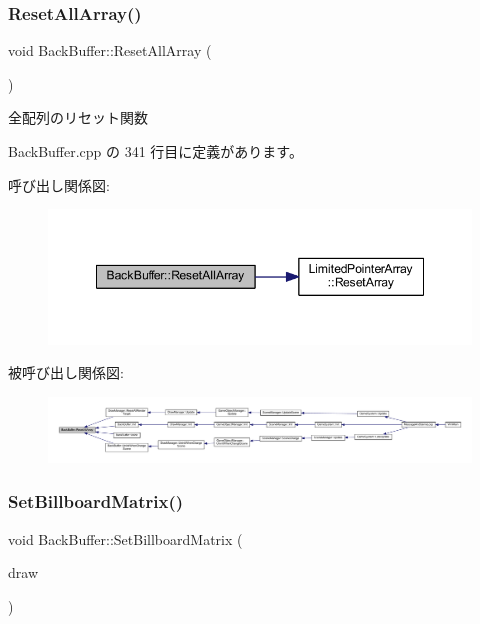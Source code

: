 \subsubsection{\texorpdfstring{Reset\+All\+Array()}{ResetAllArray()}}
{\footnotesize\ttfamily void Back\+Buffer\+::\+Reset\+All\+Array (\begin{DoxyParamCaption}{ }\end{DoxyParamCaption})}



全配列のリセット関数 



 Back\+Buffer.\+cpp の 341 行目に定義があります。

呼び出し関係図\+:
\nopagebreak
\begin{figure}[H]
\begin{center}
\leavevmode
\includegraphics[width=348pt]{class_back_buffer_a04e942576ac5de94d16764d347111234_cgraph}
\end{center}
\end{figure}
被呼び出し関係図\+:
\nopagebreak
\begin{figure}[H]
\begin{center}
\leavevmode
\includegraphics[width=350pt]{class_back_buffer_a04e942576ac5de94d16764d347111234_icgraph}
\end{center}
\end{figure}
\mbox{\label{class_back_buffer_a5c9341c9d26576781ec9abb55b937bda}} 
\subsubsection{\texorpdfstring{Set\+Billboard\+Matrix()}{SetBillboardMatrix()}}
{\footnotesize\ttfamily void Back\+Buffer\+::\+Set\+Billboard\+Matrix (\begin{DoxyParamCaption}\item[{\mbox{\hyperlink{class_draw_base}{Draw\+Base}} $\ast$}]{draw }\end{DoxyParamCaption})\hspace{0.3cm}{\ttfamily [private]}}



